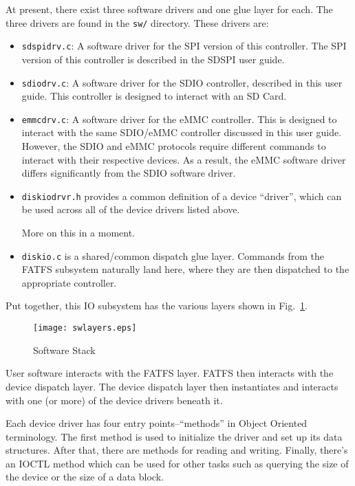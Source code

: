 \documentclass{gqtekspec}
\begin{document}
At present, there exist three software drivers and one glue layer for each.
The three drivers are found in the {\tt sw/} directory.  These drivers are:
\begin{itemize}
\item {\tt sdspidrv.c}: A software driver for the SPI version of this
	controller.  The SPI version of this controller is described in the
	SDSPI user guide.
\item {\tt sdiodrv.c}: A software driver for the SDIO controller, described
	in this user guide.  This controller is designed to interact with
	an SD Card.
\item {\tt emmcdrv.c}: A software driver for the eMMC controller.  This is
	designed to interact with the same SDIO/eMMC controller discussed in
	this user guide.  However, the SDIO and eMMC protocols require different
	commands to interact with their respective devices.  As a result, the
	eMMC software driver differs significantly from the SDIO software
	driver.
\item {\tt diskiodrvr.h} provides a common definition of a device ``driver'',
	which can be used across all of the device drivers listed above.

	More on this in a moment.
\item {\tt diskio.c} is a shared/common dispatch glue layer.  Commands
	from the FATFS subsystem naturally land here, where they are then
	dispatched to the appropriate controller.
\end{itemize}

Put together, this IO subsystem has the various layers shown in
Fig.~\ref{fig:swlayers}.
\begin{figure}\begin{center}
\texttt{[image: swlayers.eps]}
\caption{Software Stack}\label{fig:swlayers}
\end{center}\end{figure}
User software interacts with the FATFS layer.  FATFS then interacts with the
device dispatch layer.  The device dispatch layer then instantiates and
interacts with one (or more) of the device drivers beneath it.

Each device driver has four entry points--``methods'' in Object Oriented
terminology.  The first method is used to initialize the driver and set up
its data structures.  After that, there are methods for reading and writing.
Finally, there's an IOCTL method which can be used for other tasks such as
querying the size of the device or the size of a data block.
\end{document}
